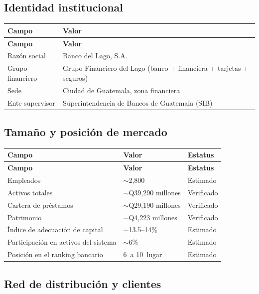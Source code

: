 \documentclass[11pt,a4paper]{article}
\begin{document}
	\subsection{Identidad institucional}
	
	\begin{longtable}{@{}p{3cm}p{12cm}@{}}
		\toprule
		\textbf{Campo} & \textbf{Valor} \\ \midrule
		\endfirsthead
		\toprule
		\textbf{Campo} & \textbf{Valor} \\ \midrule
		\endhead
		Razón social & Banco del Lago, S.A. \\
		Grupo financiero & Grupo Financiero del Lago (banco + financiera + tarjetas + seguros) \\
		Sede & Ciudad de Guatemala, zona financiera \\
		Ente supervisor & Superintendencia de Bancos de Guatemala (SIB) \\
		\bottomrule
	\end{longtable}
	
	\subsection{Tamaño y posición de mercado}
	
	\begin{longtable}{@{}p{7cm}p{4cm}p{3.5cm}@{}}
		\toprule
		\textbf{Campo} & \textbf{Valor} & \textbf{Estatus} \\ \midrule
		\endfirsthead
		\toprule
		\textbf{Campo} & \textbf{Valor} & \textbf{Estatus} \\ \midrule
		\endhead
		Empleados & $\sim$2,800 & Estimado \\
		Activos totales & $\sim$Q39,290 millones & Verificado \\
		Cartera de préstamos & $\sim$Q29,190 millones & Verificado \\
		Patrimonio & $\sim$Q4,223 millones & Verificado \\
		Índice de adecuación de capital & $\sim$13.5--14\% & Estimado \\
		Participación en activos del sistema & $\sim$6\% & Estimado \\
		Posición en el ranking bancario & 6\textdegree \, a 10\textdegree \, lugar & Estimado \\
		\bottomrule
	\end{longtable}
	
	\subsection{Red de distribución y clientes}
	
\end{document}
